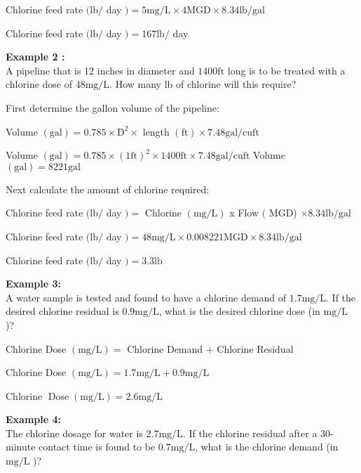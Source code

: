 \documentclass{article}
\begin{document}
Chlorine feed rate $(\mathrm{lb} /$ day $)=5 \mathrm{mg} / \mathrm{L} \times 4 \mathrm{MGD} \times 8.34 \mathrm{lb} / \mathrm{gal}$

Chlorine feed rate $(\mathrm{lb} /$ day $)=167 \mathrm{lb} /$ day

\textbf{Example 2 :}\\
A pipeline that is 12 inches in diameter and $1400 \mathrm{ft}$ long is to be treated with a chlorine dose of $48 \mathrm{mg} / \mathrm{L}$. How many lb of chlorine will this require?

First determine the gallon volume of the pipeline:

Volume $(\mathrm{gal})=0.785 \times \mathrm{D}^{2} \times$ length $(\mathrm{ft}) \times 7.48 \mathrm{gal} / \mathrm{cu} \mathrm{ft}$

Volume $(\mathrm{gal})=0.785 \times(1 \mathrm{ft})^{2} \times 1400 \mathrm{ft} \times 7.48 \mathrm{gal} / \mathrm{cu} \mathrm{ft}$ Volume $(\mathrm{gal})=8221 \mathrm{gal}$

Next calculate the amount of chlorine required:

Chlorine feed rate $(\mathrm{lb} /$ day $)=$ Chlorine $(\mathrm{mg} / \mathrm{L})$ x Flow $($ MGD) $\times 8.34 \mathrm{lb} / \mathrm{gal}$

Chlorine feed rate $(\mathrm{lb} /$ day $)=48 \mathrm{mg} / \mathrm{L} \times 0.008221 \mathrm{MGD} \times 8.34 \mathrm{lb} / \mathrm{gal}$

Chlorine feed rate $(\mathrm{lb} /$ day $)=3.3 \mathrm{lb}$

\textbf{Example 3:}\\
A water sample is tested and found to have a chlorine demand of $1.7 \mathrm{mg} / \mathrm{L}$. If the desired chlorine residual is $0.9 \mathrm{mg} / \mathrm{L}$, what is the desired chlorine dose (in $\mathrm{mg} / \mathrm{L}$ )?

Chlorine Dose $(\mathrm{mg} / \mathrm{L})=$ Chlorine Demand $+$ Chlorine Residual

Chlorine Dose $(\mathrm{mg} / \mathrm{L})=1.7 \mathrm{mg} / \mathrm{L}+0.9 \mathrm{mg} / \mathrm{L}$

Chlorine $\operatorname{Dose}(\mathrm{mg} / \mathrm{L})=2.6 \mathrm{mg} / \mathrm{L}$

\textbf{Example 4:}\\
The chlorine dosage for water is $2.7 \mathrm{mg} / \mathrm{L}$. If the chlorine residual after a 30-minute contact time is found to be $0.7 \mathrm{mg} / \mathrm{L}$, what is the chlorine demand (in $\mathrm{mg} / \mathrm{L}$ )?
\end{document}
